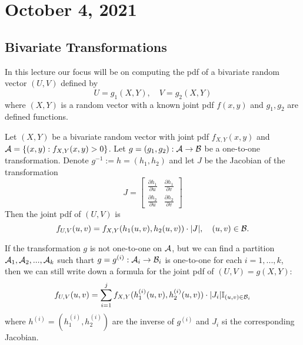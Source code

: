 \section{October 4, 2021}
\subsection{Bivariate Transformations}
In this lecture our focus will be on computing the pdf of a bivariate random vector $(U,V)$ defined by
$$
U = g_1(X,Y), \quad V = g_2(X,Y)
$$
where $(X,Y)$ is a random vector with a known joint pdf $f(x,y)$ and $g_1,g_2$ are defined functions.

\begin{theorem}
Let $(X,Y)$ be a bivariate random vector with joint pdf $f_{X,Y}(x,y)$ and $\mathcal A = \{
(x,y): f_{X,Y}(x,y)>0
\}$.
Let $g=(g_1,g_2): \mathcal A \to \mathcal B$ be a one-to-one transformation. Denote $g^{-1}:=h = (h_1,h_2)$ and let $J$ be the Jacobian of the transformation
    $$
    J = 
    \begin{bmatrix} \frac{\partial h_1}{\partial u} &
    \frac{\partial h_1}{\partial v} \\ 
    \frac{\partial h_2}{\partial u} & 
    \frac{\partial h_2}{\partial v}
    \end{bmatrix}
    $$
  Then the joint pdf of $(U,V)$ is 
  $$
  f_{U,V}(u,v) = f_{X,Y}(h_1(u,v),h_2(u,v)) \cdot |J|, \quad (u,v) \in \mathcal B.
  $$
\end{theorem}
If the transformation $g$ is not one-to-one on $\mathcal A$, but we can find a partition $\mathcal A_1,\mathcal A_2,...,\mathcal A_k$ such thart $g = g^{(i)}:\mathcal A_i \to \mathcal B_i$ is one-to-one for each $i = 1,...,k$, then we can still write down a formula for the joint pdf of $(U,V) = g(X,Y)$:
$$
f_{U,V}(u,v) = \sum_{i=1}^{j}f_{X,Y}(h_1^{(i)}(u,v),h_2^{(i)}(u,v)) \cdot |J_i|\mathbb I_{(u,v) \in \mathcal B_i}
$$
where $h^{(i)} = (h_1^{(i)},h_2^{(i)})$ are the inverse of $g^{(i)}$ and $J_i$ si the corresponding Jacobian.